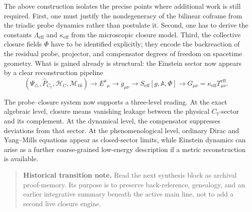 \begin{remark}
The above construction isolates the precise points where additional work is
still required.
First, one must justify the nondegeneracy of the bilinear coframe from the
triadic probe dynamics rather than postulate it.
Second, one has to derive the constants $\Lambda_{\mathrm{eff}}$ and
$\kappa_{\mathrm{eff}}$ from the microscopic closure model.
Third, the collective closure fields $\Phi$ have to be identified explicitly;
they encode the backreaction of the residual probe, projector, and compensator
degrees of freedom on spacetime geometry.
What is gained already is structural: the Einstein sector now appears by a
clear reconstruction pipeline
\[
  (\Psi_\triangle,\hat P_{C_7},\mathcal H_C,\mathcal M_{16})
  \longrightarrow E^a{}_{\mu}
  \longrightarrow g_{\mu\nu}
  \longrightarrow S_{\mathrm{eff}}[g,\mathbb A,\Phi]
  \longrightarrow G_{\mu\nu}=\kappa_{\mathrm{eff}}T_{\mu\nu}^{\mathrm{eff}}.
\]
\end{remark}

\begin{remark}
The probe--closure system now supports a three-level reading.
At the exact algebraic level, closure means vanishing leakage between the
physical $C_7$-sector and its complement.
At the dynamical level, the compensator suppresses deviations from that
sector.
At the phenomenological level, ordinary Dirac and Yang--Mills equations
appear as closed-sector limits, while Einstein dynamics can arise as a
further coarse-grained low-energy description if a metric reconstruction is
available.
\end{remark}

\begin{quote}\small
\noindent\textbf{Historical transition note.} Read the next synthesis block as archival proof-memory. Its purpose is to preserve back-reference, genealogy, and an earlier integrative summary beneath the active main line, not to add a second live closure engine.
\end{quote}




